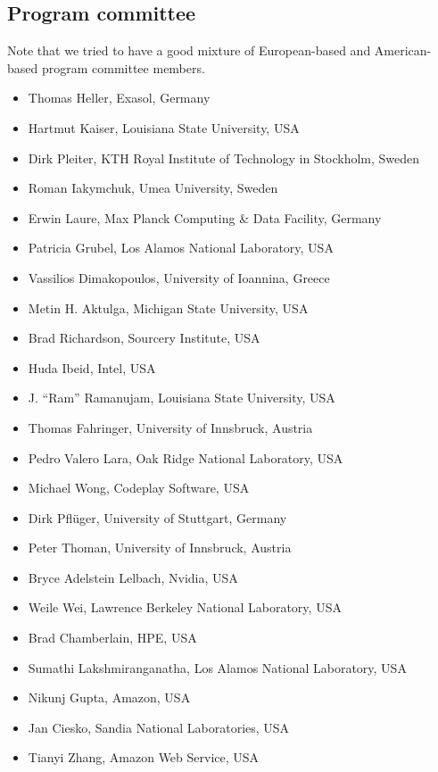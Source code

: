 \documentclass{article}
\begin{document}
\subsection{Program committee}
Note that we tried to have a good mixture of European-based and American-based program committee members.

\begin{itemize}

    \item Thomas Heller, Exasol, Germany
    \item Hartmut Kaiser, Louisiana State University, USA
    \item Dirk Pleiter, KTH Royal Institute of Technology in Stockholm, Sweden
    \item Roman Iakymchuk, Umea University, Sweden
    \item Erwin Laure, Max Planck Computing \& Data Facility, Germany
    \item Patricia Grubel, Los Alamos National Laboratory, USA
    \item Vassilios Dimakopoulos, University of Ioannina, Greece
    \item Metin H. Aktulga, Michigan State University, USA
    \item Brad Richardson, Sourcery Institute, USA
    \item Huda Ibeid, Intel, USA
    \item J. “Ram” Ramanujam, Louisiana State University, USA
    \item Thomas Fahringer, University of Innsbruck, Austria
    \item Pedro Valero Lara, Oak Ridge National Laboratory, USA
    \item Michael Wong, Codeplay Software, USA
    \item Dirk Pflüger, University of Stuttgart, Germany
    \item Peter Thoman, University of Innsbruck, Austria
    \item Bryce Adelstein Lelbach, Nvidia, USA
    \item Weile Wei, Lawrence Berkeley National Laboratory, USA
    \item Brad Chamberlain, HPE, USA
    \item Sumathi Lakshmiranganatha, Los Alamos National Laboratory, USA
    \item Nikunj Gupta, Amazon, USA
    \item Jan Ciesko, Sandia National Laboratories, USA
   \item Tianyi Zhang, Amazon Web Service, USA
\end{itemize}
\end{document}
